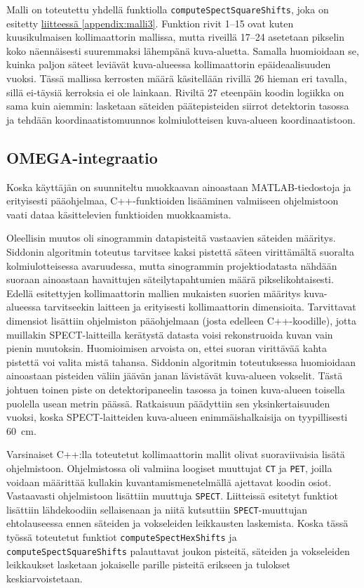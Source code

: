 Malli on toteutettu yhdellä funktiolla \texttt{computeSpectSquareShifts}, joka on esitetty \hyperref[appendix:malli3]{liitteessä \ref*{appendix:malli3}}. Funktion rivit 1--15 ovat kuten kuusikulmaisen kollimaattorin mallissa, mutta riveillä 17--24 asetetaan pikselin koko näennäisesti suuremmaksi lähempänä kuva-aluetta. Samalla huomioidaan se, kuinka paljon säteet leviävät kuva-alueessa kollimaattorin epäideaalisuuden vuoksi. Tässä mallissa kerrosten määrä käsitellään rivillä 26 hieman eri tavalla, sillä ei-täysiä kerroksia ei ole lainkaan. Riviltä 27 eteenpäin koodin logiikka on sama kuin aiemmin: lasketaan säteiden päätepisteiden siirrot detektorin tasossa ja tehdään koordinaatistomuunnos kolmiulotteisen kuva-alueen koordinaatistoon.

\subsection{OMEGA-integraatio}
Koska käyttäjän on suunniteltu muokkaavan ainoastaan MATLAB-tiedostoja ja erityisesti pääohjelmaa, C++-funktioiden lisääminen valmiiseen ohjelmistoon vaati dataa käsittelevien funktioiden muokkaamista.

Oleellisin muutos oli sinogrammin datapisteitä vastaavien säteiden määritys. Siddonin algoritmin toteutus tarvitsee kaksi pistettä säteen virittämältä suoralta kolmiulotteisessa avaruudessa, mutta sinogrammin projektiodatasta nähdään suoraan ainoastaan havaittujen säteilytapahtumien määrä pikselikohtaisesti. Edellä esitettyjen kollimaattorin mallien mukaisten suorien määritys kuva-alueessa tarvitseekin laitteen ja erityisesti kollimaattorin dimensioita. Tarvittavat dimensiot lisättiin ohjelmiston pääohjelmaan (josta edelleen C++-koodille), jotta muillakin SPECT-laitteilla kerätystä datasta voisi rekonstruoida kuvan vain pienin muutoksin. Huomioimisen arvoista on, ettei suoran virittävää kahta pistettä voi valita mistä tahansa. Siddonin algoritmin toteutuksessa huomioidaan ainoastaan pisteiden väliin jäävän janan lävistävät kuva-alueen vokselit. Tästä johtuen toinen piste on detektoripaneelin tasossa ja toinen kuva-alueen toisella puolella usean metrin päässä. Ratkaisuun päädyttiin sen yksinkertaisuuden vuoksi, koska SPECT-laitteiden kuva-alueen enimmäishalkaisija on tyypillisesti \qty{60}{\centi\meter}\cite{cherry_single_2012}.

Varsinaiset C++:lla toteutetut kollimaattorin mallit olivat suoraviivaisia lisätä ohjelmistoon. Ohjelmistossa oli valmiina loogiset muuttujat \texttt{CT} ja \texttt{PET}, joilla voidaan määrittää kullakin kuvantamismenetelmällä ajettavat koodin osiot. Vastaavasti ohjelmistoon lisättiin muuttuja \texttt{SPECT}. Liitteissä esitetyt funktiot lisättiin lähdekoodiin sellaisenaan ja niitä kutsuttiin \texttt{SPECT}-muuttujan ehtolauseessa ennen säteiden ja vokseleiden leikkausten laskemista. Koska tässä työssä toteutetut funktiot \texttt{computeSpectHexShifts} ja \texttt{computeSpectSquareShifts} palauttavat joukon pisteitä, säteiden ja vokseleiden leikkaukset lasketaan jokaiselle parille pisteitä erikseen ja tulokset keskiarvoistetaan.

